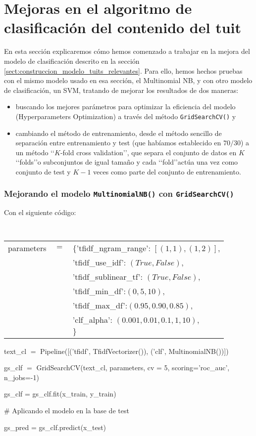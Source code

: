 \section{Mejoras en el algoritmo de clasificación del contenido del tuit}
\label{sect:mejoras_alg_clasificacion_tuit}
En esta sección explicaremos cómo hemos comenzado a trabajar en la mejora del modelo de clasificación descrito en la sección \ref{sect:construccion_modelo_tuits_relevantes}.
Para ello, hemos hechos pruebas con el mismo modelo usado en esa sección, el Multinomial NB, y con otro modelo de clasificación, un SVM, tratando de mejorar los resultados de dos maneras:
\begin{itemize}
\item buscando los mejores parámetros para optimizar la eficiencia del modelo 
(Hyperparameters Optimization) a través del método {\tt GridSearchCV()} y 
\item cambiando el método de entrenamiento, desde
el método sencillo de separación entre entrenamiento y test (que habíamos establecido en $70/30$) a un método \lq\lq $K$-fold cross validation\rq\rq, que separa el conjunto de datos en $K$ \lq\lq folds\rq\rq o subconjuntos de igual tamaño y cada \lq\lq fold\rq\rq actúa una vez como conjunto de test y $K-1$ veces como parte del conjunto de entrenamiento.
\end{itemize}

\subsubsection{Mejorando el modelo {\tt MultinomialNB()} con {\tt GridSearchCV()}}
Con el siguiente código:

\medskip

{\tt
\noindent\begin{tabular}{rcl}
parameters &$=$& $\{$'tfidf\_ngram\_range': $[(1,1),(1,2)]$,\\
              &&'tfidf\_use\_idf': $(True, False)$,\\
              &&'tfidf\_sublinear\_tf': $(True, False)$,\\
              &&'tfidf\_min\_df':$(0, 5, 10)$,\\
              &&'tfidf\_max\_df':$(0.95, 0.90, 0.85)$,\\
              &&'clf\_alpha': $(0.001, 0.01, 0.1, 1,10),$\\
			  &&$\}$
\end{tabular}

\noindent text\_cl $=$ Pipeline([('tfidf', TfidfVectorizer()),
					('clf', MultinomialNB())])



\noindent gs\_clf $=$ GridSearchCV(text\_cl, parameters, cv = 5, scoring='roc\_auc', n\_jobs=-1)

\noindent gs\_clf = gs\_clf.fit(x\_train, y\_train)
    
\noindent\# Aplicando el modelo en la base de test

\noindent gs\_pred = gs\_clf.predict(x\_test)

}

